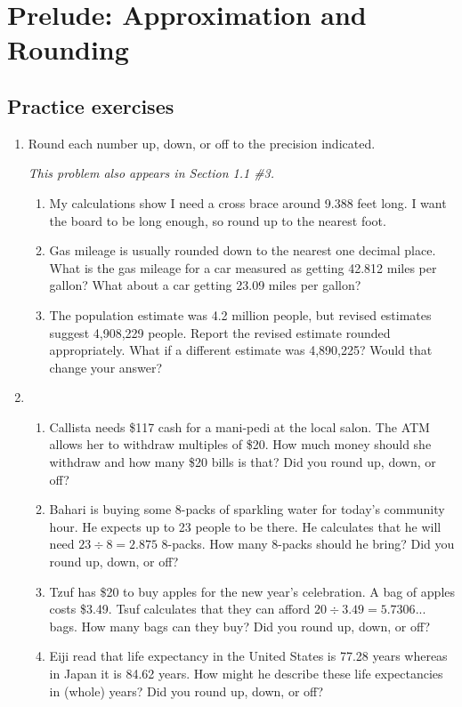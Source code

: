 
\section{Prelude: Approximation and Rounding} 

\subsection*{Practice exercises}

\begin{enumerate}
\item Round each number up, down, or off to the precision indicated.

\emph{This problem also appears in Section 1.1 \#3.}

\begin{enumerate}
\item My calculations show I need a cross brace around 9.388 feet long. I want the board to be long enough, so round up to the nearest foot.
\vfill
\item Gas mileage is usually rounded down to the nearest one decimal place.  What is the gas mileage for a car measured as getting 42.812 miles per gallon?  What about a car getting 23.09 miles per gallon?
\vfill
\item The population estimate was 4.2 million people, but revised estimates suggest 4,908,229 people.  Report the revised estimate rounded appropriately. What if a different estimate was 4,890,225?  Would that change your answer?
\vfill
\end{enumerate}

\newpage 

\item \begin{enumerate}
\item Callista needs \$117 cash for a mani-pedi at the local salon.  The ATM allows her to withdraw multiples of \$20.  How much money should she withdraw and how many \$20 bills is that? Did you round up, down, or off? 
\vfill
\item Bahari is buying some 8-packs of sparkling water for today's community hour. He expects up to 23 people to be there.  He calculates that he will need $23 \div 8 = 2.875$ 8-packs.  How many 8-packs should he bring?  Did you round up, down, or off? 
\vfill
\item Tzuf has \$20 to buy apples for the new year's celebration.  A bag of apples costs \$3.49.  Tsuf calculates that they can afford $20 \div 3.49 = 5.7306...$ bags. How many bags can they buy? Did you round up, down, or off?  
\vfill
\item Eiji read that life expectancy in the United States is 77.28 years whereas in Japan it is 84.62 years.  How might he describe these life expectancies in (whole) years? Did you round up, down, or off? 
\vfill
\end{enumerate}


\end{enumerate}
